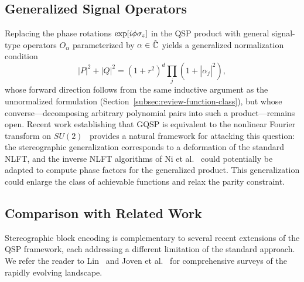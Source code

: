 \subsection{Generalized Signal Operators}
\label{subsec:generalized}

Replacing the phase rotations $\exp[i\phi\sigma_z]$ in the QSP
product with general signal-type operators $O_\alpha$
parameterized by $\alpha \in \hat{\mathbb{C}}$ yields a generalized
normalization condition
\begin{equation}
	|P|^2 + |Q|^2
	= (1{+}r^2)^d \textstyle\prod_j(1{+}|\alpha_j|^2),
	\label{eq:generalized-norm}
\end{equation}
whose forward direction follows from the same inductive argument
as the unnormalized formulation
(Section~\ref{subsec:review-function-class}), but whose
converse---decomposing arbitrary polynomial pairs into such a
product---remains open.  Recent work establishing that GQSP is
equivalent to the nonlinear Fourier transform on
$SU(2)$~\cite{Laneve2025b,AlexisBeckerEtAl2026} provides a
natural framework for attacking this question: the
stereographic generalization corresponds to a deformation of the
standard NLFT, and the inverse NLFT algorithms of
Ni et al.~\cite{NiSarkarYingLin2025} could potentially be
adapted to compute phase factors for the generalized product.
This generalization could enlarge the
class of achievable functions and relax the parity constraint.

\subsection{Comparison with Related Work}
\label{subsec:related}

Stereographic block encoding is complementary to several recent
extensions of the QSP framework, each addressing a different
limitation of the standard approach.  We refer the reader to
Lin~\cite{Lin2025} and Joven et al.~\cite{JovenEtAl2025} for
comprehensive surveys of the rapidly evolving landscape.

